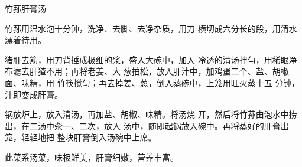 \begin{recipe}{竹荪肝膏汤}

\ingredients


\cooking

\step 竹荪用温水泡十分钟，洗净、去脚、去净杂质，用刀 横切成六分长的段，用清水漂着待用。

\step 猪肝去筋，用刀背捶成极细的浆，盛入大碗中，加入 冷透的清汤拌勻，用稀眼净布滤去肝猹不用；再将老姜、大 葱拍松，放入肝汁中，加鸡蛋二个、盐、胡椒面、味精，用 竹筷搅匀；再去掉姜、葱，倒入蒸碗中，上笼用旺火蒸十五 分钟，汁即变成肝膏。

\step 锅放炉上，放入清汤，再加盐、胡椒、味精。将汤烧 开，然后将竹荪由泡水中捞出，在二汤中汆一、二次，放入 汤中，随即起锅放入碗中。再将蒸好的肝膏出笼，轻轻地把 整块肝膏倒入汤碗中上席。

\notes

此菜系汤菜，味极鲜美，肝膏细嫩，营养丰富。

\end{recipe}


